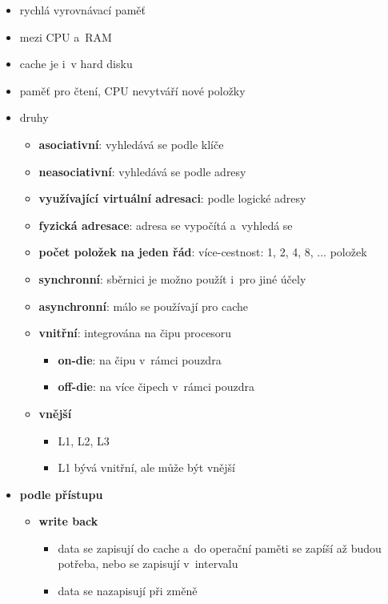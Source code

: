 \documentclass[a4paper,12pt]{article}
\providecommand{\tightlist}{%
\setlength{\itemsep}{0pt}\setlength{\parskip}{0pt}}
\begin{document}
\begin{itemize}
  \tightlist
  \item rychlá vyrovnávací paměť
  \item mezi CPU a~RAM
  \item cache je i~v hard disku
  \item paměť pro čtení, CPU nevytváří nové položky
  \item druhy
  \begin{itemize}
    \tightlist
    \item \textbf{asociativní}: vyhledává se podle klíče
    \item \textbf{neasociativní}: vyhledává se podle adresy
    \item \textbf{využívající virtuální adresaci}: podle logické adresy
    \item \textbf{fyzická adresace}: adresa se vypočítá a~vyhledá se
    \item \textbf{počet položek na jeden řád}: více-cestnost: 1, 2, 4, 8, ...
    položek
    \item \textbf{synchronní}: sběrnici je možno použít i~pro jiné účely
    \item \textbf{asynchronní}: málo se používají pro cache
    \item \textbf{vnitřní}: integrována na čipu procesoru
    \begin{itemize}
      \tightlist
      \item \textbf{on-die}: na čipu v~rámci pouzdra
      \item \textbf{off-die}: na více čipech v~rámci pouzdra
    \end{itemize}
    \item \textbf{vnější}
    \begin{itemize}
      \tightlist
      \item L1, L2, L3
      \item L1 bývá vnitřní, ale může být vnější
    \end{itemize}
  \end{itemize}
  \item \textbf{podle přístupu}
  \begin{itemize}
    \tightlist
    \item \textbf{write back}
    \begin{itemize}
      \tightlist
      \item data se zapisují do cache a~do operační paměti se zapíší až budou
      potřeba, nebo se zapisují v~intervalu
      \item data se nazapisují při změně

\end{itemize}
\end{itemize}
\end{itemize}
\end{document}
